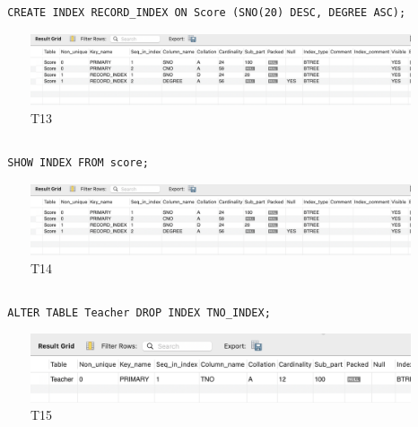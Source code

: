 \documentclass[UTF8]{ctexart}
\begin{document}
\subsection{}
\begin{lstlisting}
  CREATE INDEX RECORD_INDEX ON Score (SNO(20) DESC, DEGREE ASC);
\end{lstlisting}
\begin{figure}[H]
  \centering
  \includegraphics[scale=0.4]{pics/13.png}
  \caption*{T13}
\end{figure}

\subsection{}
\begin{lstlisting}
  SHOW INDEX FROM score;
\end{lstlisting}
\begin{figure}[H]
  \centering
  \includegraphics[scale=0.4]{pics/13.png}
  \caption*{T14}
\end{figure}

\subsection{}
\begin{lstlisting}
  ALTER TABLE Teacher DROP INDEX TNO_INDEX;
\end{lstlisting}
\begin{figure}[H]
  \centering
  \includegraphics[scale=0.4]{pics/15.png}
  \caption*{T15}
\end{figure}
\end{document}
